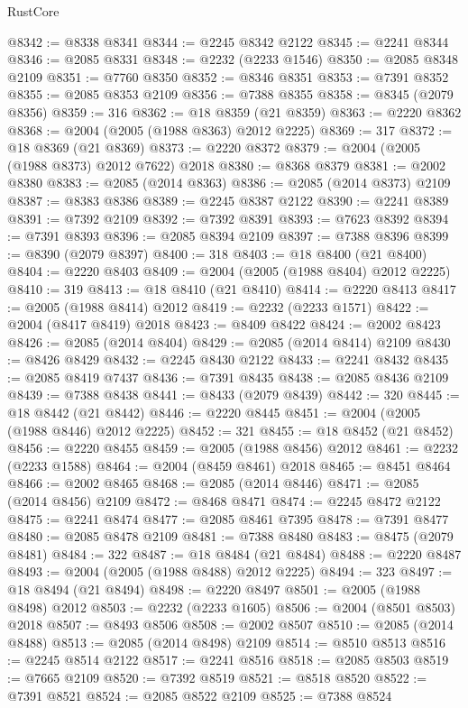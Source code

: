 \begin{lexlean}{RustCore}
\begin{coremodule}
@8342 := @8338 @8341
@8344 := @2245 @8342 @2122
@8345 := @2241 @8344
@8346 := @2085 @8331
@8348 := @2232 (@2233 @1546)
@8350 := @2085 @8348 @2109
@8351 := @7760 @8350
@8352 := @8346 @8351
@8353 := @7391 @8352
@8355 := @2085 @8353 @2109
@8356 := @7388 @8355
@8358 := @8345 (@2079 @8356)
@8359 := 316
@8362 := @18 @8359 (@21 @8359)
@8363 := @2220 @8362
@8368 := @2004 (@2005 (@1988 @8363) @2012 @2225)
@8369 := 317
@8372 := @18 @8369 (@21 @8369)
@8373 := @2220 @8372
@8379 := @2004 (@2005 (@1988 @8373) @2012 @7622) @2018
@8380 := @8368 @8379
@8381 := @2002 @8380
@8383 := @2085 (@2014 @8363)
@8386 := @2085 (@2014 @8373) @2109
@8387 := @8383 @8386
@8389 := @2245 @8387 @2122
@8390 := @2241 @8389
@8391 := @7392 @2109
@8392 := @7392 @8391
@8393 := @7623 @8392
@8394 := @7391 @8393
@8396 := @2085 @8394 @2109
@8397 := @7388 @8396
@8399 := @8390 (@2079 @8397)
@8400 := 318
@8403 := @18 @8400 (@21 @8400)
@8404 := @2220 @8403
@8409 := @2004 (@2005 (@1988 @8404) @2012 @2225)
@8410 := 319
@8413 := @18 @8410 (@21 @8410)
@8414 := @2220 @8413
@8417 := @2005 (@1988 @8414) @2012
@8419 := @2232 (@2233 @1571)
@8422 := @2004 (@8417 @8419) @2018
@8423 := @8409 @8422
@8424 := @2002 @8423
@8426 := @2085 (@2014 @8404)
@8429 := @2085 (@2014 @8414) @2109
@8430 := @8426 @8429
@8432 := @2245 @8430 @2122
@8433 := @2241 @8432
@8435 := @2085 @8419 @7437
@8436 := @7391 @8435
@8438 := @2085 @8436 @2109
@8439 := @7388 @8438
@8441 := @8433 (@2079 @8439)
@8442 := 320
@8445 := @18 @8442 (@21 @8442)
@8446 := @2220 @8445
@8451 := @2004 (@2005 (@1988 @8446) @2012 @2225)
@8452 := 321
@8455 := @18 @8452 (@21 @8452)
@8456 := @2220 @8455
@8459 := @2005 (@1988 @8456) @2012
@8461 := @2232 (@2233 @1588)
@8464 := @2004 (@8459 @8461) @2018
@8465 := @8451 @8464
@8466 := @2002 @8465
@8468 := @2085 (@2014 @8446)
@8471 := @2085 (@2014 @8456) @2109
@8472 := @8468 @8471
@8474 := @2245 @8472 @2122
@8475 := @2241 @8474
@8477 := @2085 @8461 @7395
@8478 := @7391 @8477
@8480 := @2085 @8478 @2109
@8481 := @7388 @8480
@8483 := @8475 (@2079 @8481)
@8484 := 322
@8487 := @18 @8484 (@21 @8484)
@8488 := @2220 @8487
@8493 := @2004 (@2005 (@1988 @8488) @2012 @2225)
@8494 := 323
@8497 := @18 @8494 (@21 @8494)
@8498 := @2220 @8497
@8501 := @2005 (@1988 @8498) @2012
@8503 := @2232 (@2233 @1605)
@8506 := @2004 (@8501 @8503) @2018
@8507 := @8493 @8506
@8508 := @2002 @8507
@8510 := @2085 (@2014 @8488)
@8513 := @2085 (@2014 @8498) @2109
@8514 := @8510 @8513
@8516 := @2245 @8514 @2122
@8517 := @2241 @8516
@8518 := @2085 @8503
@8519 := @7665 @2109
@8520 := @7392 @8519
@8521 := @8518 @8520
@8522 := @7391 @8521
@8524 := @2085 @8522 @2109
@8525 := @7388 @8524

\end{coremodule}
\end{lexlean}
